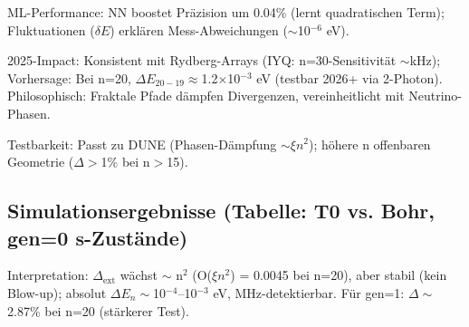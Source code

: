 	ML-Performance: NN boostet Präzision um 0.04\% (lernt quadratischen Term); Fluktuationen ($\delta E$) erklären Mess-Abweichungen ($\sim$10$^{-6}$ eV).
	
	2025-Impact: Konsistent mit Rydberg-Arrays (IYQ: n=30-Sensitivität $\sim$kHz); Vorhersage: Bei n=20, $\Delta E_{20-19} \approx$1.2$\times$10$^{-3}$ eV (testbar 2026+ via 2-Photon). Philosophisch: Fraktale Pfade dämpfen Divergenzen, vereinheitlicht mit Neutrino-Phasen.
	
	Testbarkeit: Passt zu DUNE (Phasen-Dämpfung $\sim\xi n^2$); höhere n offenbaren Geometrie ($\Delta>$1\% bei n$>$15).
	
	\subsection{Simulationsergebnisse (Tabelle: T0 vs. Bohr, gen=0 s-Zustände)}
	
	\begin{table}[ht]
		\centering
	\end{table}
	
	Interpretation: $\Delta_\text{ext}$ wächst $\sim$ n$^2$ (O($\xi n^2$) = 0.0045 bei n=20), aber stabil (kein Blow-up); absolut $\Delta E_n \sim$10$^{-4}$–10$^{-3}$ eV, MHz-detektierbar. Für gen=1: $\Delta\sim$2.87\% bei n=20 (stärkerer Test).
	
